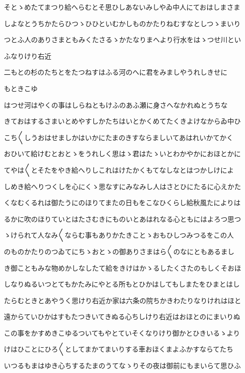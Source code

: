 \documentclass[a4paper,11pt,landscape]{ltjtarticle}
\begin{document}
そとゝめたてまつり給へらむとそ思ひしあないみしやゐ中人にておはしまさま
\par\medskip
しよなとうちかたらひつゝひひといむかしものかたりねむすなとしつゝまいり
\par\medskip
つとふ人のありさまともみくたさるゝかたなりまへより行水をはゝつせ川とい
\par\medskip
ふなりけり右近
\par\medskip
二もとの杉のたちとをたつねすはふる河のへに君をみましやうれしきせに
\par\medskip
もときこゆ
\par\medskip
はつせ河はやくの事はしらねともけふのあふ瀬に身さへなかれぬとうちな
\par\medskip
きておはするさまいとめやすしかたちはいとかくめてたくきよけなからゐ中ひ
\par\medskip
こち〱しうおはせましかはいかにたまのきすならましいてあはれいかてかく
\par\medskip
おひいて給けむとおとゝをうれしく思はゝ君はたゝいとわかやかにおほとかに
\par\medskip
てやは〱とそたをやき給へりしこれはけたかくもてなしなとはつかしけによ
\par\medskip
しめき給へりつくしを心にくゝ思なすにみなみし人はさとひにたるに心えかた
\par\medskip
くなむくるれは御たうにのほりてまたの日もをこなひくらし給秋風たによりは
\par\medskip
るかに吹のほりていとはたさむきにものいとあはれなる心ともにはよろつ思つ
\par\medskip
ゝけられて人なみ〱ならむ事もありかたきことゝおもひしつみつるをこの人
\par\medskip
のものかたりのつゐてにちゝおとゝの御ありさまはら〱のなにともあるまし
\par\medskip
き御こともみな物めかしなしたて給をきけはかゝるしたくさたのもしくそおほ
\par\medskip
しなりぬるいつとてもかたみにやとる所もとひかはしてもしまたをひまとはし
\par\medskip
たらむときとあやうく思けり右近か家は六条の院ちかきわたりなりけれはほと
\par\medskip
遠からていひかはすもたつきいてきぬる心ちしけり右近はおほとのにまいりぬ
\par\medskip
この事をかすめきこゆるついてもやとていそくなりけり御かとひきいるゝより
\par\medskip
けはひことにひろ〱としてまかてまいりする車おほくまよふかすならてたち
\par\medskip
いつるもまはゆき心ちするたまのうてなゝりその夜は御前にもまいらて思ひふ
\end{document}
